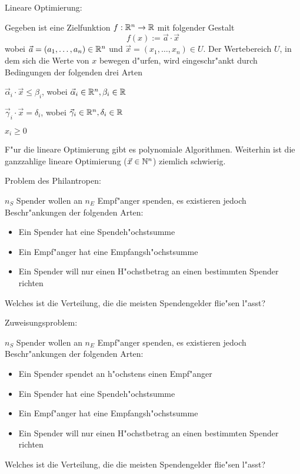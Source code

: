 \problem Lineare Optimierung:{
  Gegeben ist eine Zielfunktion $f:\mathbb R^n\to\mathbb R$ mit folgender Gestalt
  \[
    f(x):=\vec a\cdot \vec x
  \]
  wobei $\vec a=(a_1,\ldots,a_n)\in\mathbb R^n$ und $\vec x=(x_1,\ldots,x_n)\in U$.
  Der Wertebereich $U$, in dem sich die Werte von $x$ bewegen d"urfen,
  wird eingeschr"ankt durch Bedingungen der folgenden drei Arten
  \begin{stmts}
    \item $\vec\alpha_i \cdot \vec x \le \beta_i$, 
      wobei $\vec\alpha_i\in\mathbb R^n,\beta_i\in\mathbb R$
    \item $\vec\gamma_i \cdot\vec x = \delta_i$, 
      wobei $\vec\gamma_i\in\mathbb R^n,\delta_i\in\mathbb R$
    \item $x_i\ge 0$
  \end{stmts}
  F"ur die lineare Optimierung gibt es polynomiale Algorithmen. Weiterhin
  ist die ganzzahlige lineare Optimierung ($\vec x\in\mathbb N^n$) ziemlich 
  schwierig.
}
\problem Problem des Philantropen:{
  $n_S$ Spender wollen an $n_E$ Empf"anger spenden, es existieren jedoch
  Beschr"ankungen der folgenden Arten:
  \begin{itemize}
    \item Ein Spender hat eine Spendeh"ochstsumme
    \item Ein Empf"anger hat eine Empfangsh"ochstsumme
    \item Ein Spender will nur einen H"ochstbetrag an einen bestimmten Spender
      richten
  \end{itemize}
  Welches ist die Verteilung, die die meisten Spendengelder flie"sen l"asst?
}
\problem Zuweisungsproblem:{
  $n_S$ Spender wollen an $n_E$ Empf"anger spenden, es existieren jedoch
  Beschr"ankungen der folgenden Arten:
  \begin{itemize}
    \item Ein Spender spendet an h"ochstens einen Empf"anger
    \item Ein Spender hat eine Spendeh"ochstsumme
    \item Ein Empf"anger hat eine Empfangsh"ochstsumme
    \item Ein Spender will nur einen H"ochstbetrag an einen bestimmten Spender
      richten
  \end{itemize}
  Welches ist die Verteilung, die die meisten Spendengelder flie"sen l"asst?
}

